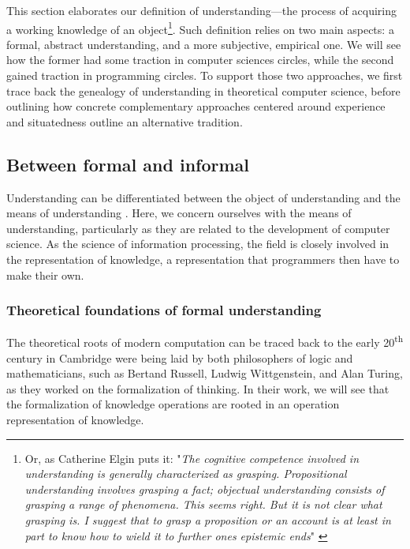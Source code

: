 This section elaborates our definition of understanding—the process of acquiring a working knowledge of an object\footnote{Or, as Catherine Elgin puts it: "\emph{The cognitive competence involved in understanding is generally characterized as grasping. Propositional understanding involves grasping a fact; objectual understanding consists of grasping a range of phenomena. This seems right. But it is not clear what grasping is. I suggest that to grasp a proposition or an account is at least in part to know how to wield it to further ones epistemic ends}" \citep{elgin_true_2017}}. Such definition relies on two main aspects: a formal, abstract understanding, and a more subjective, empirical one. We will see how the former had some traction in computer sciences circles, while the second gained traction in programming circles. To support those two approaches, we first trace back the genealogy of understanding in theoretical computer science, before outlining how concrete complementary approaches centered around experience and situatedness outline an alternative tradition.

\subsection{Between formal and informal}
\label{subsec:formal-informal}

Understanding can be differentiated between the object of understanding and the means of understanding \citep{elgin_true_2017}. Here, we concern ourselves with the means of understanding, particularly as they are related to the development of computer science. As the science of information processing, the field is closely involved in the representation of knowledge, a representation that programmers then have to make their own.

\subsubsection{Theoretical foundations of formal understanding}
\label{subsubsec:theoretical-understanding}

The theoretical roots of modern computation can be traced back to the early 20\textsuperscript{th} century in Cambridge were being laid by both philosophers of logic and mathematicians, such as Bertand Russell, Ludwig Wittgenstein, and Alan Turing, as they worked on the formalization of thinking. In their work, we will see that the formalization of knowledge operations are rooted in an operation representation of knowledge.

